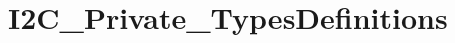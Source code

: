 \hypertarget{group___i2_c___private___types_definitions}{\section{I2\-C\-\_\-\-Private\-\_\-\-Types\-Definitions}
\label{group___i2_c___private___types_definitions}
}
